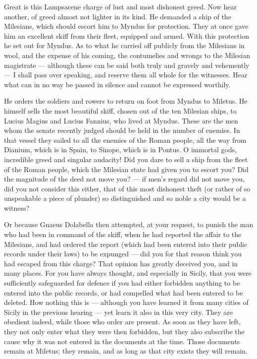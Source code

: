  Great is this Lampsacene charge of lust and most dishonest greed. Now hear another, of greed almost not lighter in its kind. He demanded a ship of the Milesians, which should escort him to Myndus for protection. They at once gave him an excellent skiff from their fleet, equipped and armed. With this protection he set out for Myndus. As to what he carried off publicly from the Milesians in wool, and the expense of his coming, the contumelies and wrongs to the Milesian magistrate --- although these can be said both truly and gravely and vehemently --- I shall pass over speaking, and reserve them all whole for the witnesses. Hear what can in no way be passed in silence and cannot be expressed worthily.

 He orders the soldiers and rowers to return on foot from Myndus to Miletus. He himself sells the most beautiful skiff, chosen out of the ten Milesian ships, to Lucius Magius and Lucius Fannius, who lived at Myndus. These are the men whom the senate recently judged should be held in the number of enemies. In that vessel they sailed to all the enemies of the Roman people, all the way from Dianium, which is in Spain, to Sinope, which is in Pontus. O immortal gods, incredible greed and singular audacity! Did you dare to sell a ship from the fleet of the Roman people, which the Milesian state had given you to escort you? Did the magnitude of the deed not move you? --- if men's regard did not move you, did you not consider this either, that of this most dishonest theft (or rather of so unspeakable a piece of plunder) so distinguished and so noble a city would be a witness?

 Or because Gnaeus Dolabella then attempted, at your request, to punish the man who had been in command of the skiff, when he had reported the affair to the Milesians, and had ordered the report (which had been entered into their public records under their laws) to be expunged --- did you for that reason think you had escaped from this charge? That opinion has greatly deceived you, and in many places. For you have always thought, and especially in Sicily, that you were sufficiently safeguarded for defence if you had either forbidden anything to be entered into the public records, or had compelled what had been entered to be deleted. How nothing this is --- although you have learned it from many cities of Sicily in the previous hearing --- yet learn it also in this very city. They are obedient indeed, while those who order are present. As soon as they have left, they not only enter what they were then forbidden, but they also subscribe the cause why it was not entered in the documents at the time. Those documents remain at Miletus; they remain, and as long as that city exists they will remain.

